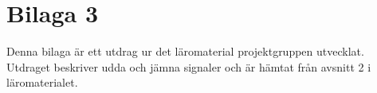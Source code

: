 \documentclass[12pt,a4paper,twoside,openright]{article}
\begin{document}
\section{Bilaga 3}
\label{bil:3}
Denna bilaga är ett utdrag ur det läromaterial projektgruppen
utvecklat. Utdraget beskriver udda och jämna signaler och är hämtat
från avsnitt 2 i läromaterialet.

\end{document}
